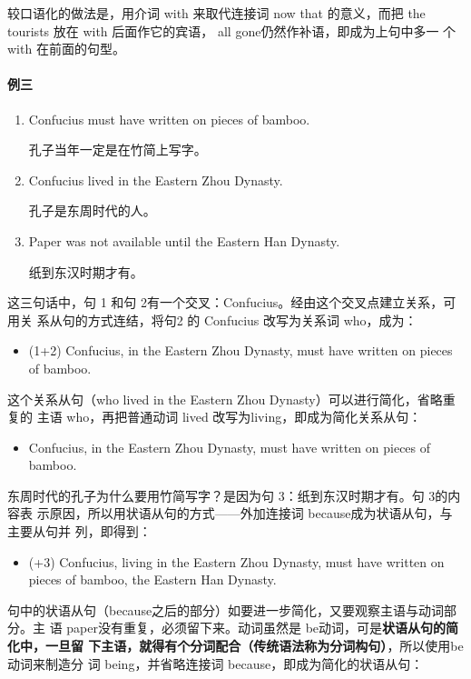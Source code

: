 较口语化的做法是，用介词 with 来取代连接词 now that 的意义，而把 the
tourists 放在 with 后面作它的宾语， all gone仍然作补语，即成为上句中多一
个 with 在前面的句型。

\paragraph{例三}

\begin{enumerate}
\item Confucius must have written on pieces of bamboo.

  孔子当年一定是在竹简上写字。
\item Confucius lived in the Eastern Zhou Dynasty.

  孔子是东周时代的人。
\item Paper was not available until the Eastern Han Dynasty.

  纸到东汉时期才有。
\end{enumerate}

这三句话中，句 1 和句 2有一个交叉：Confucius。经由这个交叉点建立关系，可用关
系从句的方式连结，将句2 的 Confucius 改写为关系词 who，成为：
\begin{itemize}
\item (1+2) Confucius,  in the Eastern Zhou Dynasty, must have
  written on pieces of bamboo.
\end{itemize}
这个关系从句（who lived in the Eastern Zhou Dynasty）可以进行简化，省略重复的
主语 who，再把普通动词 lived 改写为living，即成为简化关系从句：
\begin{itemize}
\item Confucius,  in the Eastern Zhou Dynasty, must have written on
  pieces of bamboo.
\end{itemize}
东周时代的孔子为什么要用竹简写字？是因为句 3：纸到东汉时期才有。句 3的内容表
示原因，所以用状语从句的方式——外加连接词 because成为状语从句，与主要从句并
列，即得到：
\begin{itemize}
\item (+3) Confucius, living in the Eastern Zhou Dynasty, must have written on
  pieces of bamboo,  the Eastern Han Dynasty.
\end{itemize}

句中的状语从句（because之后的部分）如要进一步简化，又要观察主语与动词部分。主
语 paper没有重复，必须留下来。动词虽然是 be动词，可是\textbf{状语从句的简化中，一旦留
下主语，就得有个分词配合（传统语法称为分词构句）}，所以使用be 动词来制造分
词 being，并省略连接词 because，即成为简化的状语从句：

